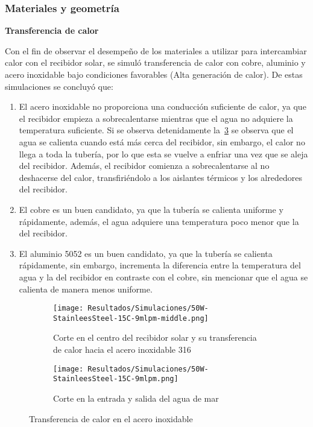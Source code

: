 			\subsubsection{Materiales y geometría}
			
				\textbf{Transferencia de calor}\par
			
				Con el fin de observar el desempeño de los materiales a utilizar para intercambiar calor con el recibidor solar, se simuló transferencia de calor con cobre, aluminio y acero inoxidable bajo condiciones favorables (Alta generación de calor). De estas simulaciones se concluyó que:
				
				\begin{enumerate}
					\item El acero inoxidable no proporciona una conducción suficiente de calor, ya que el recibidor empieza a sobrecalentarse mientras que el agua no adquiere la temperatura suficiente. Si se observa detenidamente la~\cref{fig:stainless-steel-heat-transfer} se observa que el agua se calienta cuando está más cerca del recibidor, sin embargo, el calor no llega a toda la tubería, por lo que esta se vuelve a enfriar una vez que se aleja del recibidor. Además, el recibidor comienza a sobrecalentarse al no deshacerse del calor, transfiriéndolo a los aislantes térmicos y los alrededores del recibidor. 
					\item El cobre es un buen candidato, ya que la tubería se calienta uniforme y rápidamente, además, el agua adquiere una temperatura poco menor que la del recibidor.
					
					\item El aluminio 5052 es un buen candidato, ya que la tubería se calienta rápidamente, sin embargo, incrementa la diferencia entre la temperatura del agua y la del recibidor en contraste con el cobre, sin mencionar que el agua se calienta de manera menos uniforme.
				\end{enumerate}
				
				\begin{figure}[H]
					\centering
					\begin{subfigure}[t]{\linewidth}
						\centering
						\texttt{[image: Resultados/Simulaciones/50W-StainleesSteel-15C-9mlpm-middle.png]}
						\caption{Corte en el centro del recibidor solar y su transferencia de calor hacia el acero inoxidable 316}
						\label{fig:50W-StainleesSteel-15C-9mlpm-middle}
					\end{subfigure}
					\hfill
					\begin{subfigure}[t]{0.45\linewidth}
						\centering
						\texttt{[image: Resultados/Simulaciones/50W-StainleesSteel-15C-9mlpm.png]}
						\caption{Corte en la entrada y salida del agua de mar}
						\label{fig:50W-StainleesSteel-15C-9mlpm}
					\end{subfigure}
					\hfill
					\caption{Transferencia de calor en el acero inoxidable}
					\label{fig:stainless-steel-heat-transfer}
				\end{figure}
				
